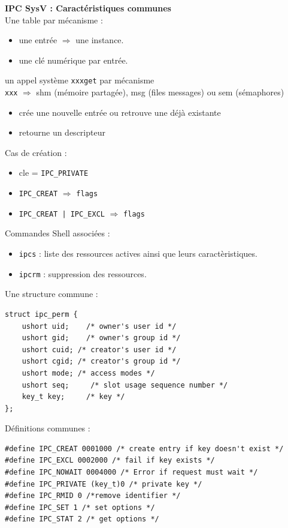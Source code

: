\documentclass[french]{scrartcl}
\begin{document}
\begin{multicols}{3}
\vskip 5pt
\textbf{IPC SysV : Caractéristiques communes}\\
Une table par mécanisme :
\begin{itemize}
	\item une entrée $\Rightarrow$ une instance.
	\item une clé numérique par entrée.
\end{itemize}

un appel système \lstinline!xxxget! par mécanisme\\
\lstinline!xxx! $\Rightarrow$ shm (mémoire partagée), msg (files messages) ou sem (sémaphores)
\begin{itemize}
	\item crée une nouvelle entrée ou retrouve une déjà existante
	\item retourne un descripteur
\end{itemize}

Cas de création :
\begin{itemize}
	\item cle = \lstinline!IPC_PRIVATE!
	\item \lstinline!IPC_CREAT! $\Rightarrow$ \lstinline!flags!
	\item \lstinline!IPC_CREAT | IPC_EXCL! $\Rightarrow$ \lstinline!flags!
\end{itemize}

Commandes Shell associées :
\begin{itemize}
	\item \lstinline!ipcs! : liste des ressources actives ainsi que leurs caractèristiques.
	\item \lstinline!ipcrm! : suppression des ressources.
\end{itemize}

Une structure commune :
\vspace{-6pt}\begin{lstlisting}
struct ipc_perm {
	ushort uid;    /* owner's user id */
	ushort gid;    /* owner's group id */
	ushort cuid; /* creator's user id */
	ushort cgid; /* creator's group id */
	ushort mode; /* access modes */
	ushort seq;     /* slot usage sequence number */
	key_t key;     /* key */
};
\end{lstlisting}\vspace{-5pt}

Définitions communes :
\vspace{-5pt}\begin{lstlisting}
#define IPC_CREAT 0001000 /* create entry if key doesn't exist */
#define IPC_EXCL 0002000 /* fail if key exists */
#define IPC_NOWAIT 0004000 /* Error if request must wait */
#define IPC_PRIVATE (key_t)0 /* private key */
#define IPC_RMID 0 /*remove identifier */
#define IPC_SET 1 /* set options */
#define IPC_STAT 2 /* get options */
\end{lstlisting}\vspace{-5pt}


\end{multicols}
\end{document}
